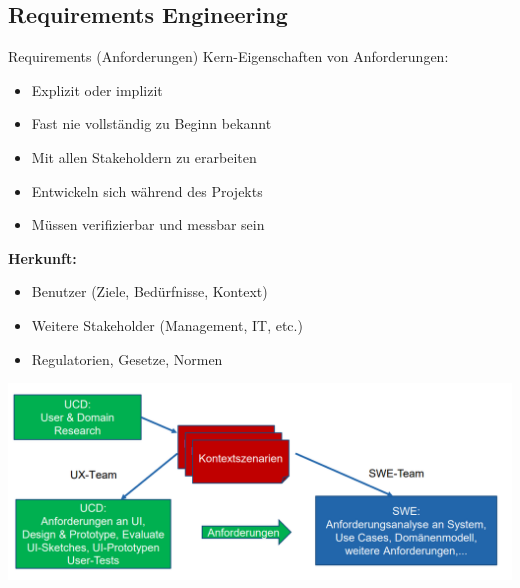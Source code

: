 
\subsection{Requirements Engineering}

\begin{definition}{Requirements (Anforderungen)}
Kern-Eigenschaften von Anforderungen:
\begin{itemize}
    \item Explizit oder implizit
    \item Fast nie vollständig zu Beginn bekannt
    \item Mit allen Stakeholdern zu erarbeiten
    \item Entwickeln sich während des Projekts
    \item Müssen verifizierbar und messbar sein
\end{itemize}

\textbf{Herkunft:}
\begin{itemize}
    \item Benutzer (Ziele, Bedürfnisse, Kontext)  
    \item Weitere Stakeholder (Management, IT, etc.)
    \item Regulatorien, Gesetze, Normen
\end{itemize}

\includegraphics[width=\linewidth]{images/user_anforderungen.png}
\end{definition}

